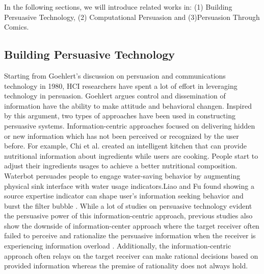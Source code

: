 
In the following sections, we will introduce related works in: (1) Building Persuasive Technology, (2) Computational Persuasion and (3)Persuasion Through Comics.

\subsection{Building Persuasive Technology}
Starting from Goehlert's discussion on persuasion and communications technology in 1980, HCI researchers have spent a lot of effort in leveraging technology in persuasion\cite{goehlert1980information}. Goehlert argues control and dissemination of information have the ability to make attitude and behavioral changen\cite{goehlert1980information}. Inspired by this argument, two types of approaches have been used in constructing persuasive systems. Information-centric approaches focused on delivering hidden or new information which has not been perceived or recognized by the user before\cite{LeeKF11}. For example, Chi et al. created an intelligent kitchen that can provide nutritional information about ingredients while users are cooking\cite{chi2007enabling}. People start to adjust their ingredients usages to achieve a better nutritional composition. Waterbot persuades people to engage water-saving behavior by augmenting physical sink interface with water usage indicators\cite{arroyo2005waterbot}.Liao and Fu found showing a source expertise indicator can shape user's information seeking behavior and burst the filter bubble \cite{liao2014expert}. While a lot of studies on persuasive technology evident the persuasive power of this information-centric approach, previous studies also show the downside of information-center approach where the target receiver often failed to perceive and rationalize the persuasive information when the receiver is experiencing information overload \cite{goehlert1980information,LeeKF11}. Additionally, the information-centric approach often relays on the target receiver can make rational decisions based on provided information whereas the premise of rationality does not always hold.

